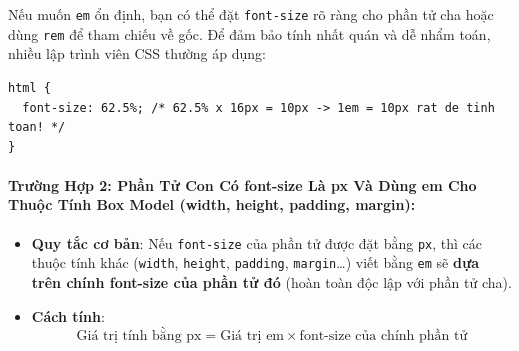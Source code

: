 \documentclass[11pt,oneside]{book}
\newcommand{\thd}[1]{\textcolor{white}{\textbf{\strut #1}}}
\newcommand{\codeinline}[1]{\textcolor{accentOrange}{\texttt{#1}}}
\begin{document}
\begin{prettyTableBox}
\sffamily\small
{}
\end{prettyTableBox}

\begin{tipBox}
Nếu muốn \codeinline{em} ổn định, bạn có thể đặt \codeinline{font-size} rõ ràng cho phần tử cha hoặc dùng \codeinline{rem} để tham chiếu về gốc. Để đảm bảo tính nhất quán và dễ nhẩm toán, nhiều lập trình viên CSS thường áp dụng:
\begin{lstlisting}[language=CSS3]
html {
  font-size: 62.5%; /* 62.5% x 16px = 10px -> 1em = 10px rat de tinh toan! */
}
\end{lstlisting}
\end{tipBox}

\paragraph{Trường Hợp 2: Phần Tử Con Có font-size Là px Và Dùng em Cho Thuộc Tính Box Model (width, height, padding, margin):}
\begin{itemize}[leftmargin=1.5em, itemsep=2pt, parsep=0pt]
    \item \textbf{Quy tắc cơ bản}: Nếu \codeinline{font-size} của phần tử được đặt bằng \codeinline{px}, thì các thuộc tính khác (\codeinline{width}, \codeinline{height}, \codeinline{padding}, \codeinline{margin}\dots) viết bằng \codeinline{em} sẽ \textbf{dựa trên chính font-size của phần tử đó} (hoàn toàn độc lập với phần tử cha).
    \item \textbf{Cách tính}:
    \[
    \text{Giá trị tính bằng px} = \text{Giá trị em} \times \text{font-size của chính phần tử}
    \]
\end{itemize}
\end{document}
